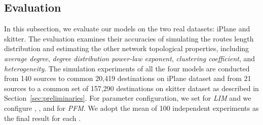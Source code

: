\documentclass[a4paper]{llncs}
\begin{document}
\subsection{Evaluation}
In this subsection, we evaluate our models on the two real datasets: iPlane and skitter. The evaluation examines their accuracies of simulating the routes length distribution and estimating the other network topological properties, including {\it average degree}, {\it degree distribution power-law exponent}, {\it clustering coefficient}, and {\it heterogeneity}. The simulation experiments of all the four models are conducted from 140 sources to common 20,419 destinations on iPlane dataset and from 21 sources to a common set of 157,290 destinations on skitter dataset as described in Section~\ref{sec:preliminaries}. For parameter configuration, we set  for \textit{LIM} and we configure , , and  for \textit{PFM}. We adopt the mean of 100
independent experiments as the final result for each .
\begin{comment}
\begin{figure*}[!t]
\centering
\subfigure[iPlane]{
\label{figure5:subfig:a}
\texttt{[image: figure/figure5a.eps]}
}
\subfigure[skitter]{
\label{figure5:subfig:b}
\texttt{[image: figure/figure5b.eps]}
}
\vspace{-1.7em}
\caption{The average routes length of the real traces and the four models on two real datasets: iPlane and skitter, respectively.}
\label{figure5}
\vspace{-0.5em}
\end{figure*}
\begin{figure*}[!t]
\centering
\subfigure[iPlane]{
\label{figure6:subfig:a}
\texttt{[image: figure/figure6a.eps]}
}
\subfigure[skitter]{
\label{figure6:subfig:b}
\texttt{[image: figure/figure6b.eps]}
}
\vspace{-1.7em}
\caption{The Kullback-Leibler divergence of the routes length distribution between the real traces and the four models on two real datasets: iPlane and skitter, respectively.}
\label{figure6}
\vspace{-0.5em}
\end{figure*}
\end{comment}
\end{document}
